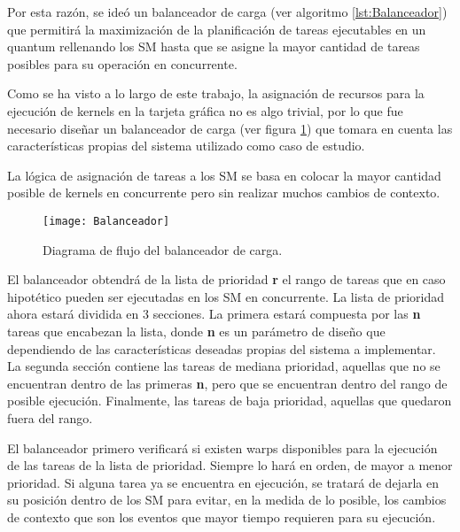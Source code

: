 Por esta razón, se ideó un balanceador de carga (ver algoritmo \ref{lst:Balanceador}) que permitirá la maximización de la planificación de tareas ejecutables en un quantum rellenando los SM hasta que se asigne la mayor cantidad de tareas posibles para su operación en concurrente.
\newline

Como se ha visto a lo largo de este trabajo, la asignación de recursos para la ejecución de kernels en la tarjeta gráfica no es algo trivial, por lo que fue necesario diseñar un balanceador de carga (ver figura \ref{fig:Balanceador1}) que tomara en cuenta las características propias del sistema utilizado como caso de estudio.
\newline

La lógica de asignación de tareas a los SM se basa en colocar la mayor cantidad posible de kernels en concurrente pero sin realizar muchos cambios de contexto.
\newline

    \begin{figure}[!]
      \centering
        \texttt{[image: Balanceador]}
        \caption{Diagrama de flujo del balanceador de carga.}
        \label{fig:Balanceador1}
    \end{figure}



El balanceador obtendrá de la lista de prioridad \textbf{r} el rango de tareas que en caso hipotético pueden ser ejecutadas en los SM en concurrente.
La lista de prioridad ahora estará dividida en 3 secciones. La primera estará compuesta por las \textbf{n} tareas que encabezan la lista, donde \textbf{n} es un parámetro de diseño que dependiendo de las características deseadas propias del sistema a implementar. 
La segunda sección contiene las tareas de mediana prioridad, aquellas que no se encuentran dentro de las primeras \textbf{n}, pero que se encuentran dentro del rango de posible ejecución. 
Finalmente, las tareas de baja prioridad, aquellas que quedaron fuera del rango.
\newline

El balanceador primero verificará si existen warps disponibles para la ejecución de las tareas de la lista de prioridad. Siempre lo hará en orden, de mayor a menor prioridad. Si alguna tarea ya se encuentra en ejecución, se tratará de dejarla en su posición dentro de los SM para evitar, en la medida de lo posible, los cambios de contexto que son los eventos que mayor tiempo requieren para su ejecución.
\newline


